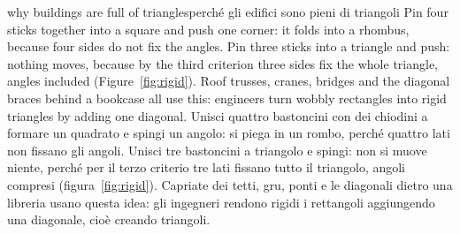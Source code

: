 \begin{example}{why buildings are full of triangles}{perché gli edifici sono pieni di triangoli}
Pin four sticks together into a square and push one corner: it folds into a rhombus, because four sides do not fix the angles. Pin three sticks into a triangle and push: nothing moves, because by the third criterion three sides fix the whole triangle, angles included (Figure~\ref{fig:rigid}). Roof trusses, cranes, bridges and the diagonal braces behind a bookcase all use this: engineers turn wobbly rectangles into rigid triangles by adding one diagonal.
\tcblower
Unisci quattro bastoncini con dei chiodini a formare un quadrato e spingi un angolo: si piega in un rombo, perché quattro lati non fissano gli angoli. Unisci tre bastoncini a triangolo e spingi: non si muove niente, perché per il terzo criterio tre lati fissano tutto il triangolo, angoli compresi (figura~\ref{fig:rigid}). Capriate dei tetti, gru, ponti e le diagonali dietro una libreria usano questa idea: gli ingegneri rendono rigidi i rettangoli aggiungendo una diagonale, cioè creando triangoli.
\end{example}

